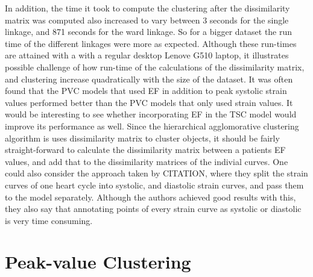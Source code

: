 In addition, the time it took to compute the clustering after the dissimilarity matrix was computed also increased to vary between 3 seconds for the single linkage, and 871 seconds for the ward linkage.
So for a bigger dataset the run time of the different linkages were more as expected. 
Although these run-times are attained with a with a regular desktop Lenove G510 laptop, it illustrates possible challenge of how run-time of the calculations of the dissimilarity matrix, and clustering increase quadratically with the size of the dataset.
It was often found that the PVC models that used EF in addition to peak systolic strain values performed better than the PVC models that only used strain values.
It would be interesting to see whether incorporating EF in the TSC model would improve its performance as well.
Since the hierarchical agglomorative clustering algorithm is uses dissimilarity matrix to cluster objects, it should be fairly straight-forward to calculate the dissimilarity matrix between a patients EF values, and add that to the dissimilarity matrices of the indivial curves.
One could also consider the approach taken by CITATION, where they split the strain curves of one heart cycle into systolic, and diastolic strain curves, and pass them to the model separately. 
Although the authors achieved good results with this, they also say that annotating points of every strain curve as systolic or diastolic is very time consuming.

\section{Peak-value Clustering}

